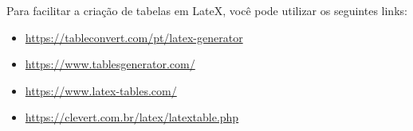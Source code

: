 Para facilitar a criação de tabelas em LateX, você pode utilizar os seguintes links: 
\begin{itemize}
\item \url{https://tableconvert.com/pt/latex-generator}
\item \url{https://www.tablesgenerator.com/}
\item \url{https://www.latex-tables.com/}
\item \url{https://clevert.com.br/latex/latextable.php}
\end{itemize}